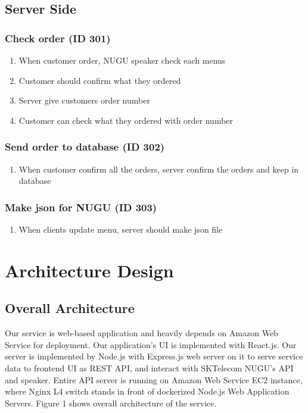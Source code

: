 \documentclass[conference,compsoc]{IEEEtran}
\begin{document}
\subsection{Server Side}

\subsubsection{Check order (ID 301)}
\begin{enumerate}
  \item When customer order, NUGU speaker check each menus
  \item Customer should confirm what they ordered
  \item Server give customers order number
  \item Customer can check what they ordered with order number  
\end{enumerate}

\subsubsection{Send order to database (ID 302)}
\begin{enumerate}
  \item When customer confirm all the orders, server confirm the orders and keep in database  
\end{enumerate}

\subsubsection{Make json for NUGU (ID 303)}
\begin{enumerate}
  \item When clients update menu, server should make json file
\end{enumerate}


\section{Architecture Design}

\subsection{Overall Architecture}

Our service is web-based application and heavily depends on Amazon Web Service for deployment. Our application's UI is implemented with React.js. Our server is implemented by Node.js with Express.js web server on it to serve service data to frontend UI as REST API, and interact with SKTelecom NUGU's API and speaker. Entire API server is running on Amazon Web Service EC2 instance, where Nginx L4 switch stands in front of dockerized Node.js Web Application Servers. Figure 1 shows overall architecture of the service.
\end{document}
